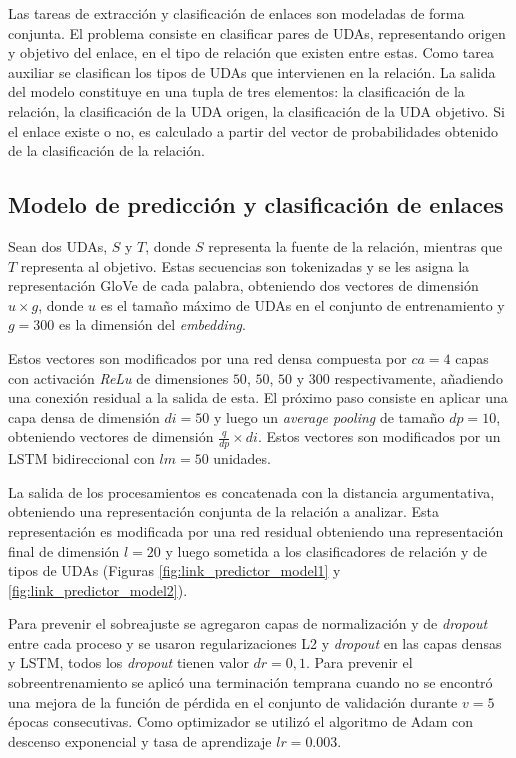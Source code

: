 \documentclass[a4paper,11pt,twocolumn,twoside]{article}
\begin{document}
Las tareas de extracción y clasificación de enlaces son modeladas de forma conjunta.
El problema consiste en clasificar pares de UDAs, representando origen y objetivo del enlace, 
en el tipo de relación que existen entre estas.
Como tarea auxiliar se clasifican los tipos de UDAs que intervienen en la relación. La salida 
del modelo constituye en una tupla de tres elementos: la clasificación de la relación, 
la clasificación de la UDA origen, la clasificación de la UDA objetivo. Si el enlace
existe o no, es calculado a partir del vector de probabilidades obtenido de la clasificación de la relación.

\subsection{Modelo de predicción y clasificación de enlaces}\label{ssec:pred_clsf_enlaces}

Sean dos UDAs, $S$ y $T$, donde $S$ representa la fuente de la relación, mientras que $T$ representa
al objetivo. Estas secuencias son tokenizadas y se les asigna la representación GloVe de cada palabra, obteniendo
dos vectores de dimensión $u \times g$, donde $u$ es el tamaño máximo de UDAs en el conjunto de entrenamiento
y $g=300$ es la dimensión del \textit{embedding}.

Estos vectores son modificados por una red densa compuesta por $ca = 4$ capas con activación \textit{ReLu}
de dimensiones $50$, $50$, $50$ y $300$ respectivamente, añadiendo una conexión residual a la salida de esta. 
El próximo paso consiste en aplicar una capa densa de dimensión $di=50$ y luego un \textit{average pooling}
de tamaño $dp=10$, obteniendo vectores de dimensión $\frac{q}{dp} \times di$. 
Estos vectores son modificados por un LSTM bidireccional con $lm=50$ unidades. 

La salida de los procesamientos es concatenada con la distancia argumentativa, obteniendo una representación 
conjunta de la relación a analizar. Esta representación es modificada por una red residual obteniendo
una representación final de dimensión $l=20$ y luego sometida a los clasificadores de relación y de tipos de UDAs
(Figuras \ref{fig:link_predictor_model1} y \ref{fig:link_predictor_model2}).

Para prevenir el sobreajuste se agregaron capas de normalización y de \textit{dropout} entre cada 
proceso y se usaron regularizaciones L2 y \textit{dropout} en las capas densas y LSTM, 
todos los \textit{dropout} tienen valor $dr=0,1$. Para prevenir el sobreentrenamiento se aplicó una 
terminación temprana cuando no se encontró una mejora de la función de pérdida en el 
conjunto de validación durante $v=5$ épocas consecutivas. Como optimizador se utilizó el algoritmo de Adam con descenso 
exponencial y tasa de aprendizaje $lr=0.003$.
\end{document}

